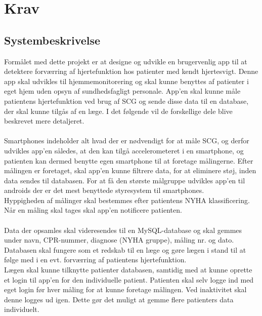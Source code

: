 \chapter{Krav}
\section{Systembeskrivelse}
Formålet med dette projekt er at designe og udvikle en brugervenlig app til at detektere forværring af hjertefunktion hos patienter med kendt hjertesvigt. Denne app skal udvikles til hjemmemonitorering og skal kunne benyttes af patienter i eget hjem uden opsyn af sundhedsfagligt personale. App’en skal kunne måle patientens hjertefunktion ved brug af SCG og sende disse data til en database, der skal kunne tilgås af en læge. I det følgende vil de forskellige dele blive beskrevet mere detaljeret.\\
\\
Smartphones indeholder alt hvad der er nødvendigt for at måle SCG, og derfor udvikles app’en således, at den kan tilgå accelerometeret i en smartphone, og patienten kan dermed benytte egen smartphone til at foretage målingerne. Efter målingen er foretaget, skal app'en kunne filtrere data, for at eliminere støj, inden data sendes til databasen. For at få den største målgruppe udvikles app’en til androids der er det mest benyttede styresystem til smartphones. \\
Hyppigheden af målinger skal bestemmes efter patientens NYHA klassificering. Når en måling skal tages skal app’en notificere patienten.\\
\\
Data der opsamles skal videresendes til en MySQL-database og skal gemmes under navn, CPR-nummer, diagnose (NYHA gruppe), måling nr. og dato. Databasen skal fungere som et redskab til en læge og gøre lægen i stand til at følge med i en evt. forværring af patientens hjertefunktion.\\
Lægen skal kunne tilknytte patienter databasen, samtidig med at kunne oprette et login til app’en for den individuelle patient. Patienten skal selv logge ind med eget login før hver måling for at kunne foretage målingen. Ved inaktivitet skal denne logges ud igen. Dette gør det muligt at gemme flere patienters data individuelt.\\
